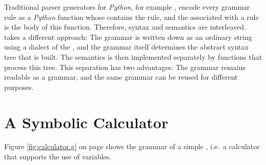 \remarkEng
Traditional parser generators for \textsl{Python}, for example
\href{https://www.dabeaz.com/ply/}{}, encode every grammar rule as a \textsl{Python}
function whose  contains the rule, and the  associated with a
rule is the body of this function.  Therefore, syntax and semantics are interleaved.  
takes a different approach:  The grammar is written down as an ordinary string using a dialect of the
 , and the grammar itself determines the abstract syntax tree
that is built.  The semantics is then implemented separately by functions that process this tree.  This
separation has two advantages:  The grammar remains readable as a grammar, and the same grammar can be
reused for different purposes.  \eox


\section{A Symbolic Calculator  \label{section:calculator}}
Figure \ref{fig:calculator.g} on page \pageref{fig:calculator.g} shows the grammar of a simple 
, i.e.~a calculator that supports the use of variables.  

